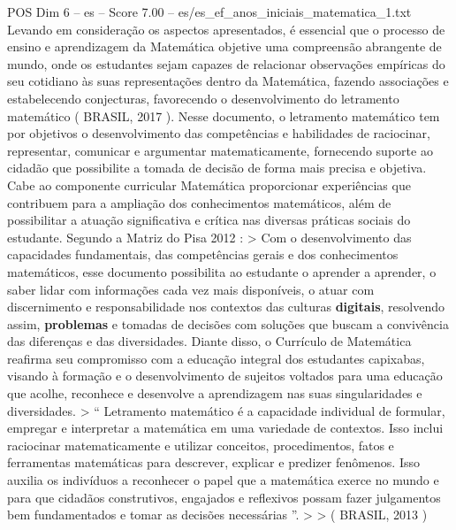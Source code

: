 \begin{textsample}{POS Dim 6 – es – Score 7.00 – es/es\_ef\_anos\_iniciais\_matematica\_1.txt}
Levando em consideração os aspectos apresentados, é essencial que o processo de ensino e aprendizagem da Matemática objetive uma compreensão abrangente de mundo, onde os estudantes sejam capazes de relacionar observações empíricas do seu cotidiano às suas representações dentro da Matemática, fazendo associações e estabelecendo conjecturas, favorecendo o desenvolvimento do letramento matemático ( BRASIL, 2017 ).
Nesse documento, o letramento matemático tem por objetivos o desenvolvimento das competências e habilidades de raciocinar, representar, comunicar e argumentar matematicamente, fornecendo suporte ao cidadão que possibilite a tomada de decisão de forma mais precisa e objetiva.
Cabe ao componente curricular Matemática proporcionar experiências que contribuem para a ampliação dos conhecimentos matemáticos, além de possibilitar a atuação significativa e crítica nas diversas práticas sociais do estudante.
Segundo a Matriz do Pisa 2012 : > Com o desenvolvimento das capacidades fundamentais, das competências gerais e dos conhecimentos matemáticos, esse documento possibilita ao estudante o aprender a aprender, o saber lidar com informações cada vez mais disponíveis, o atuar com discernimento e responsabilidade nos contextos das culturas \textbf{digitais}, resolvendo assim, \textbf{problemas} e tomadas de decisões com soluções que buscam a convivência das diferenças e das diversidades.
Diante disso, o Currículo de Matemática reafirma seu compromisso com a educação integral dos estudantes capixabas, visando à formação e o desenvolvimento de sujeitos voltados para uma educação que acolhe, reconhece e desenvolve a aprendizagem nas suas singularidades e diversidades. > “ Letramento matemático é a capacidade individual de formular, empregar e interpretar a matemática em uma variedade de contextos.
Isso inclui raciocinar matematicamente e utilizar conceitos, procedimentos, fatos e ferramentas matemáticas para descrever, explicar e predizer fenômenos.
Isso auxilia os indivíduos a reconhecer o papel que a matemática exerce no mundo e para que cidadãos construtivos, engajados e reflexivos possam fazer julgamentos bem fundamentados e tomar as decisões necessárias ”. > > ( BRASIL, 2013 )

\end{textsample}
